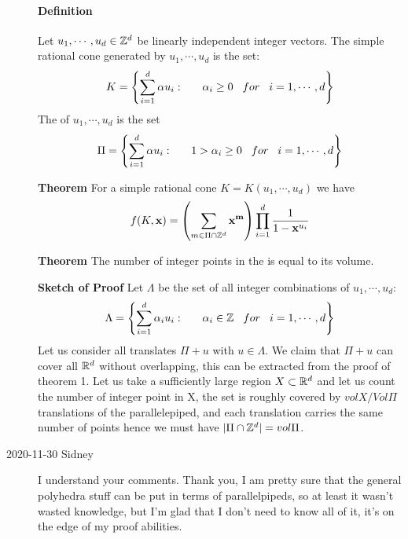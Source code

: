 \begin{description}
\paragraph{Definition } Let $u_1,\cdots ,u_d\in\mathbb{Z}^d$ be linearly independent integer vectors. The simple rational cone generated by $u_1,\cdots ,u_d$ is the set:
$$K=\left\lbrace\sum^d_{i=1}\alpha u_i:\hspace{6mm}\alpha_i\geq 0 \hspace{3mm}for\hspace{3mm}i=1,\cdots ,d\right\rbrace$$
The {\fundPip} of $u_1,\cdots ,u_d$ is the set
$$\Pi=\left\lbrace\sum^d_{i=1}\alpha u_i:\hspace{6mm}1>\alpha_i\geq 0 \hspace{3mm}for\hspace{3mm}i=1,\cdots ,d\right\rbrace$$

\textbf{Theorem}
For a simple rational cone $K=K(u_1,\cdots ,u_d)$ we have
$$f(K,\mathbf{x})=\left(\sum_{m\in\Pi\cap\mathbb{Z}^d}\mathbf{x}^\mathbf{m}\right)\prod_{i=1}^d\frac{1}{1-\mathbf{x}^{u_i}}$$

\textbf{Theorem}
The number of integer points in the {\fundPip} is equal to its volume.

\textbf{Sketch of Proof}
Let $\Lambda$ be the set of all integer combinations of $u_1,\cdots ,u_d$:
$$\Lambda=\left\lbrace\sum^d_{i=1}\alpha_i u_i:\hspace{6mm}\alpha_i\in\mathbb{Z} \hspace{3mm}for\hspace{3mm}i=1,\cdots ,d\right\rbrace$$
Let us consider all translates $\Pi+u$ with $u\in\Lambda$. We claim that $\Pi+u$ can cover all $\mathbb{R}^d$ without overlapping, this can be extracted from the proof of theorem 1. Let us take a sufficiently large  region $X\subset\mathbb{R}^d$ and let us count the number of integer point in X, the set is roughly covered by $vol X/Vol\Pi$ translations of the parallelepiped, and each translation carries the same number of points hence we must have $|\Pi\cap\mathbb{Z}^d|=vol\Pi$.

\item[2020-11-30 Sidney]

I understand your comments. Thank you, I am pretty sure that the general polyhedra stuff can be put in terms of parallelpipeds, so at least it wasn't wasted knowledge, but I'm glad that I don't need to know all of it, it's on the edge of my proof abilities.
\end{description}
